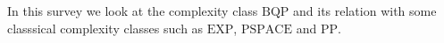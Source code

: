\documentclass[../main.tex]{subfiles}
\begin{document}
In this survey we look at the complexity class $\mathrm{BQP}$ and its relation with some classsical complexity classes such as $\mathrm{EXP}$, $\mathrm{PSPACE}$ and $\mathrm{PP}$.
\end{document}
